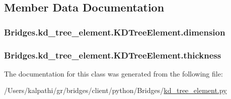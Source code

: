 \subsection{Member Data Documentation}
\hypertarget{class_bridges_1_1kd__tree__element_1_1_k_d_tree_element_ab5457d652eacbce763c8760b512ac7d7}{}
\subsubsection[{dimension}]{\setlength{\rightskip}{0pt plus 5cm}Bridges.\+kd\+\_\+tree\+\_\+element.\+K\+D\+Tree\+Element.\+dimension}\label{class_bridges_1_1kd__tree__element_1_1_k_d_tree_element_ab5457d652eacbce763c8760b512ac7d7}
\hypertarget{class_bridges_1_1kd__tree__element_1_1_k_d_tree_element_a530b78c2dcb601a9345b195c1b882d30}{}
\subsubsection[{thickness}]{\setlength{\rightskip}{0pt plus 5cm}Bridges.\+kd\+\_\+tree\+\_\+element.\+K\+D\+Tree\+Element.\+thickness}\label{class_bridges_1_1kd__tree__element_1_1_k_d_tree_element_a530b78c2dcb601a9345b195c1b882d30}


The documentation for this class was generated from the following file\+:\begin{DoxyCompactItemize}
\item 
/\+Users/kalpathi/gr/bridges/client/python/\+Bridges/\hyperlink{kd__tree__element_8py}{kd\+\_\+tree\+\_\+element.\+py}\end{DoxyCompactItemize}
